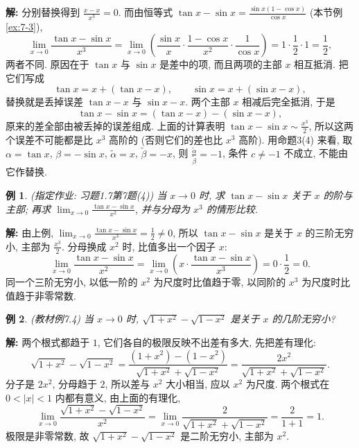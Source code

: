 \documentclass[UTF8,openany]{ctexbook}
\theoremstyle{chinesetextbook}
\newtheorem{example}{例}[section]
\newenvironment{cnsolution}{\par\indent\textbf{解:} \ignorespaces}{\par}
\begin{document}
\begin{cnsolution}
分别替换得到 $\displaystyle\frac{x-x}{x^3}=0$. 而由恒等式 $\displaystyle\tan x-\sin x=\frac{\sin x(1-\cos x)}{\cos x}$ (本节例\ref{ex:7-3}),
\[
\lim_{x\to0}\frac{\tan x-\sin x}{x^3}=\lim_{x\to0}\left(\frac{\sin x}x\cdot\frac{1-\cos x}{x^2}\cdot\frac1{\cos x}\right)=1\cdot\frac12\cdot1=\frac12,
\]
两者不同. 原因在于 $\tan x$ 与 $\sin x$ 是差中的项, 而且两项的主部 $x$ 相互抵消. 把它们写成
\[
\tan x=x+(\tan x-x),\qquad\sin x=x+(\sin x-x),
\]
替换就是丢掉误差 $\tan x-x$ 与 $\sin x-x$. 两个主部 $x$ 相减后完全抵消, 于是
\[
\tan x-\sin x=(\tan x-x)-(\sin x-x),
\]
原来的差全部由被丢掉的误差组成. 上面的计算表明 $\displaystyle\tan x-\sin x\sim\frac{x^3}2$, 所以这两个误差不可能都是比 $x^3$ 高阶的 (否则它们的差也比 $x^3$ 高阶). 用命题3(4) 来看, 取 $\alpha=\tan x$, $\beta=-\sin x$, $\widetilde\alpha=x$, $\widetilde\beta=-x$, 则 $\displaystyle\frac{\widetilde\alpha}{\widetilde\beta}=-1$, 条件 $c\ne-1$ 不成立, 不能由它作替换.
\end{cnsolution}
\begin{example}
\textnormal{(指定作业: 习题1.7第7题(4))} 当 $x\to0$ 时, 求 $\tan x-\sin x$ 关于 $x$ 的阶与主部; 再求 $\displaystyle\lim_{x\to0}\frac{\tan x-\sin x}{x^2}$, 并与分母为 $x^3$ 的情形比较.
\end{example}
\begin{cnsolution}
由上例, $\displaystyle\lim_{x\to0}\frac{\tan x-\sin x}{x^3}=\frac12\ne0$, 所以 $\tan x-\sin x$ 是关于 $x$ 的三阶无穷小, 主部为 $\displaystyle\frac{x^3}2$. 分母换成 $x^2$ 时, 比值多出一个因子 $x$:
\[
\lim_{x\to0}\frac{\tan x-\sin x}{x^2}=\lim_{x\to0}\left(x\cdot\frac{\tan x-\sin x}{x^3}\right)=0\cdot\frac12=0.
\]
同一个三阶无穷小, 以低一阶的 $x^2$ 为尺度时比值趋于零, 以同阶的 $x^3$ 为尺度时比值趋于非零常数.
\end{cnsolution}
\begin{example}
\textnormal{(教材例7.4)} 当 $x\to0$ 时, $\sqrt{1+x^2}-\sqrt{1-x^2}$ 是关于 $x$ 的几阶无穷小?
\end{example}
\begin{cnsolution}
两个根式都趋于 $1$, 它们各自的极限反映不出差有多大, 先把差有理化:
\[
\sqrt{1+x^2}-\sqrt{1-x^2}=\frac{(1+x^2)-(1-x^2)}{\sqrt{1+x^2}+\sqrt{1-x^2}}=\frac{2x^2}{\sqrt{1+x^2}+\sqrt{1-x^2}}.
\]
分子是 $2x^2$, 分母趋于 $2$, 所以差与 $x^2$ 大小相当, 应以 $x^2$ 为尺度. 两个根式在 $0<|x|<1$ 内都有意义, 由上面的有理化,
\[
\lim_{x\to0}\frac{\sqrt{1+x^2}-\sqrt{1-x^2}}{x^2}=\lim_{x\to0}\frac2{\sqrt{1+x^2}+\sqrt{1-x^2}}=\frac2{1+1}=1.
\]
极限是非零常数, 故 $\sqrt{1+x^2}-\sqrt{1-x^2}$ 是二阶无穷小, 主部为 $x^2$.
\end{cnsolution}
\end{document}
